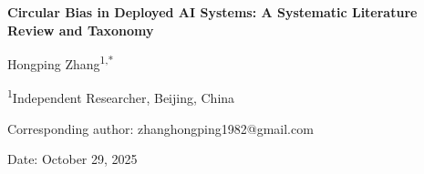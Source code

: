 \documentclass[11pt]{article}
\begin{document}
\begin{center}
{\LARGE\bfseries Circular Bias in Deployed AI Systems: A Systematic Literature Review and Taxonomy}

\vspace{1cm}

{\large Hongping Zhang\textsuperscript{1,*}}

\vspace{0.5cm}

{\small \textsuperscript{1}Independent Researcher, Beijing, China}

{\small *Corresponding author: zhanghongping1982@gmail.com}

\vspace{0.5cm}

{\small Date: October 29, 2025}
\end{center}

\vspace{1cm}
\end{document}
